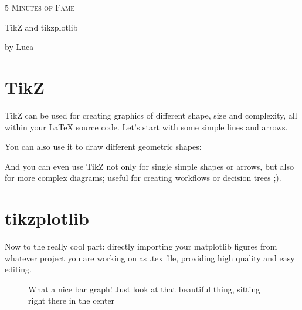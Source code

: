 \documentclass{article}
\begin{document}
\begin{center}
	{\scshape\LARGE 5 Minutes of Fame \par\vspace{5cm}}
	{\LARGE TikZ and tikzplotlib \par\vspace{5cm}}
	{\LARGE by Luca}\newpage
\end{center}

\section{TikZ}
TikZ can be used for creating graphics of different shape, size and complexity, all within your LaTeX source code. Let's start with some simple lines and arrows. \vspace{5mm}



You can also use it to draw different geometric shapes: \vspace{5mm}



And you can even use TikZ not only for single simple shapes or arrows, but also for more complex diagrams; useful for creating workflows or decision trees ;). \vspace{1mm}


\newpage

\section{tikzplotlib}
Now to the really cool part: directly importing your matplotlib figures from whatever project you are working on as .tex file, providing high quality and easy editing.


\vspace{5mm}

\begin{figure}
    \centering
    
    \caption{What a nice bar graph! Just look at that beautiful thing, sitting right there in the center}
    \label{fig:bar}
\end{figure}
\end{document}
